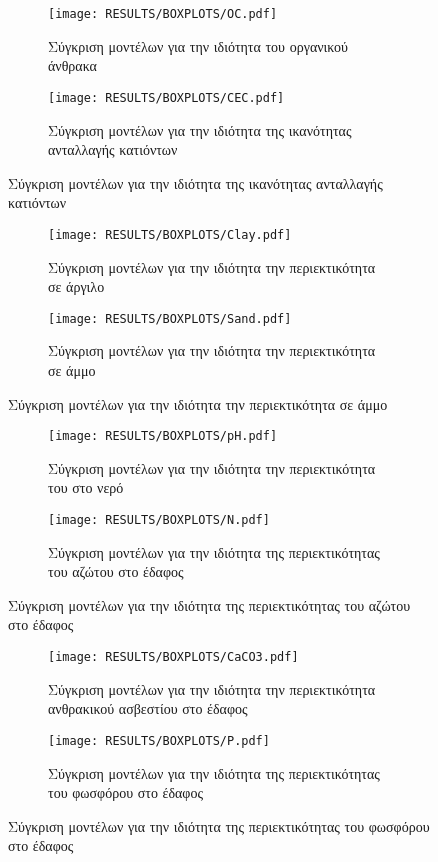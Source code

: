 \begin{figure}[H]
    \begin{subfigure}{0.5\textwidth}
        \texttt{[image: RESULTS/BOXPLOTS/OC.pdf]}
        \caption{Σύγκριση μοντέλων για την ιδιότητα του οργανικού άνθρακα}
        \label{fig:subim1}
    \end{subfigure}
    \begin{subfigure}{0.5\textwidth}
        \texttt{[image: RESULTS/BOXPLOTS/CEC.pdf]}
        \caption{Σύγκριση μοντέλων για την ιδιότητα της ικανότητας ανταλλαγής κατιόντων}
        \label{fig:subim2}
    \end{subfigure}
\end{figure}
\begin{figure}[H]
    \begin{subfigure}{0.5\textwidth}
        \texttt{[image: RESULTS/BOXPLOTS/Clay.pdf]}
        \caption{Σύγκριση μοντέλων για την ιδιότητα την περιεκτικότητα σε άργιλο}
        \label{fig:subim3}
    \end{subfigure}
    \begin{subfigure}{0.5\textwidth}
        \texttt{[image: RESULTS/BOXPLOTS/Sand.pdf]}
        \caption{Σύγκριση μοντέλων για την ιδιότητα την περιεκτικότητα σε άμμο}
        \label{fig:subim4}
    \end{subfigure}
\end{figure}
\begin{figure}[H]
    \begin{subfigure}{0.5\textwidth}
        \texttt{[image: RESULTS/BOXPLOTS/pH.pdf]}
        \caption{Σύγκριση μοντέλων για την ιδιότητα την περιεκτικότητα του  στο νερό}
        \label{fig:subim5}
    \end{subfigure}
    \begin{subfigure}{0.5\textwidth}
        \texttt{[image: RESULTS/BOXPLOTS/N.pdf]}
        \caption{Σύγκριση μοντέλων για την ιδιότητα της περιεκτικότητας του αζώτου στο έδαφος}
        \label{fig:subim6}
    \end{subfigure}
\end{figure}
\begin{figure}[H]
    \begin{subfigure}{0.5\textwidth}
        \texttt{[image: RESULTS/BOXPLOTS/CaCO3.pdf]}
        \caption{Σύγκριση μοντέλων για την ιδιότητα την περιεκτικότητα ανθρακικού ασβεστίου στο έδαφος}
        \label{fig:subim7}
    \end{subfigure}
    \begin{subfigure}{0.5\textwidth}
        \texttt{[image: RESULTS/BOXPLOTS/P.pdf]}
        \caption{Σύγκριση μοντέλων για την ιδιότητα της περιεκτικότητας του φωσφόρου στο έδαφος}
        \label{fig:subim8}
    \end{subfigure}
\end{figure}
